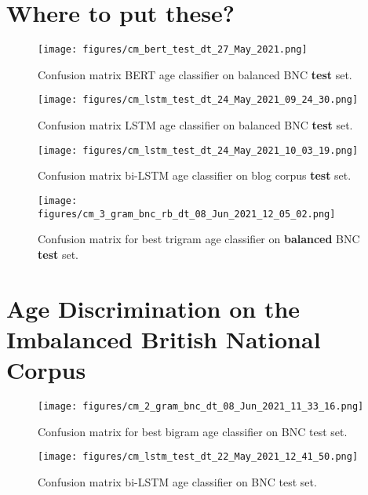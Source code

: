 \section{Where to put these?}

\begin{figure}[H]
    \centering
    \texttt{[image: figures/cm\_bert\_test\_dt\_27\_May\_2021.png]}
    \caption{Confusion matrix BERT age classifier on balanced BNC \textbf{test} set.}
    \label{fig:cm_bert_bnc_rb}
\end{figure}

\begin{figure}[H]
    \centering
    \texttt{[image: figures/cm\_lstm\_test\_dt\_24\_May\_2021\_09\_24\_30.png]}
    \caption{Confusion matrix LSTM age classifier on balanced BNC \textbf{test} set.}
    \label{fig:cm_lstm_bnc_rb}
\end{figure}

\begin{figure}[H]
    \centering
    \texttt{[image: figures/cm\_lstm\_test\_dt\_24\_May\_2021\_10\_03\_19.png]}
    \caption{Confusion matrix bi-LSTM age classifier on blog corpus \textbf{test} set.}
    \label{fig:cm_lstm_blog}
\end{figure}

\begin{figure}[H]
    \centering
    \texttt{[image: figures/cm\_3\_gram\_bnc\_rb\_dt\_08\_Jun\_2021\_12\_05\_02.png]}
    \caption{Confusion matrix for best trigram age classifier on \textbf{balanced} BNC \textbf{test} set.}
    \label{fig:cm_trigram_bnc_rb}
\end{figure}

\section{Age Discrimination on the Imbalanced British National Corpus }
\label{age_disc_bnc}

\begin{figure}[H]
    \centering
    \texttt{[image: figures/cm\_2\_gram\_bnc\_dt\_08\_Jun\_2021\_11\_33\_16.png]}
    \caption{Confusion matrix for best bigram age classifier on BNC test set.}
    \label{fig:cm_bigram_bnc}
\end{figure}

\begin{figure}[H]
    \centering
    \texttt{[image: figures/cm\_lstm\_test\_dt\_22\_May\_2021\_12\_41\_50.png]}
    \caption{Confusion matrix bi-LSTM age classifier on BNC test set.}
    \label{fig:cm_lstm_bnc}
\end{figure}

